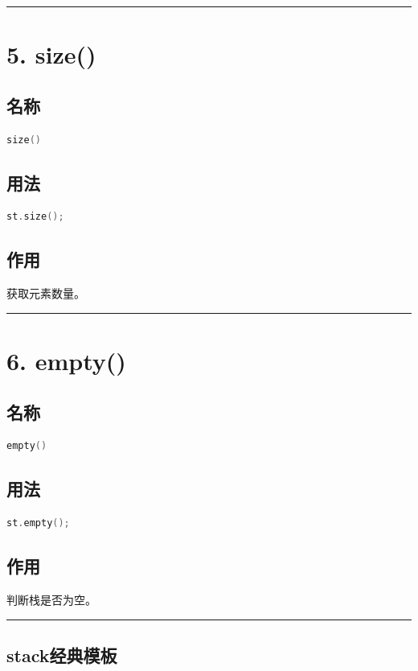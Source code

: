 \documentclass[9pt,twocolumn]{extarticle}
\begin{document}
\noindent\rule{\linewidth}{0.4pt}

\section{5. size()}

\subsection{名称}
\begin{lstlisting}[language=C++]
size()
\end{lstlisting}

\subsection{用法}
\begin{lstlisting}[language=C++]
st.size();
\end{lstlisting}

\subsection{作用}
获取元素数量。

\noindent\rule{\linewidth}{0.4pt}

\section{6. empty()}

\subsection{名称}
\begin{lstlisting}[language=C++]
empty()
\end{lstlisting}

\subsection{用法}
\begin{lstlisting}[language=C++]
st.empty();
\end{lstlisting}

\subsection{作用}
判断栈是否为空。

\noindent\rule{\linewidth}{0.4pt}

\subsection{stack经典模板}
\end{document}
